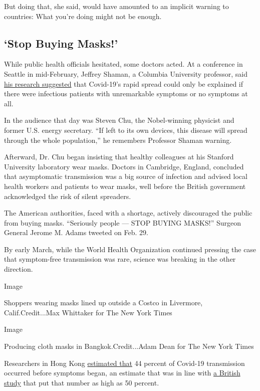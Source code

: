 But doing that, she said, would have amounted to an implicit warning to
countries: What you're doing might not be enough.

\hypertarget{stop-buying-masks}{%
\subsection{`Stop Buying Masks!'}\label{stop-buying-masks}}

While public health officials hesitated, some doctors acted. At a
conference in Seattle in mid-February, Jeffrey Shaman, a Columbia
University professor, said
\href{https://science.sciencemag.org/content/368/6490/489}{his research
suggested} that Covid-19's rapid spread could only be explained if there
were infectious patients with unremarkable symptoms or no symptoms at
all.

In the audience that day was Steven Chu, the Nobel-winning physicist and
former U.S. energy secretary. ``If left to its own devices, this disease
will spread through the whole population,'' he remembers Professor
Shaman warning.

Afterward, Dr. Chu began insisting that healthy colleagues at his
Stanford University laboratory wear masks. Doctors in Cambridge,
England, concluded that asymptomatic transmission was a big source of
infection and advised local health workers and patients to wear masks,
well before the British government acknowledged the risk of silent
spreaders.

The American authorities, faced with a shortage, actively discouraged
the public from buying masks. ``Seriously people --- STOP BUYING
MASKS!'' Surgeon General Jerome M. Adams tweeted on Feb. 29.

By early March, while the World Health Organization continued pressing
the case that symptom-free transmission was rare, science was breaking
in the other direction.

Image

Shoppers wearing masks lined up outside a Costco in Livermore,
Calif.Credit...Max Whittaker for The New York Times

Image

Producing cloth masks in Bangkok.Credit...Adam Dean for The New York
Times

Researchers in Hong Kong
\href{https://www.nature.com/articles/s41591-020-0869-5.pdf}{estimated
that} 44 percent of Covid-19 transmission occurred before symptoms
began, an estimate that was in line with
\href{https://science.sciencemag.org/content/368/6491/eabb6936}{a
British study} that put that number as high as 50 percent.

